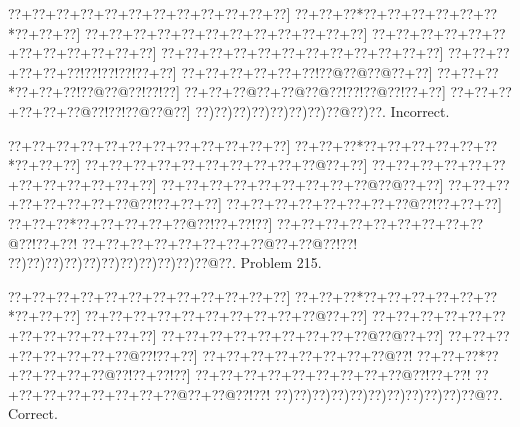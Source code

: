 \documentclass[a5paper]{article}
\begin{document}
\begin{center}
{\goo
\0??+\0??+\0??+\0??+\0??+\0??+\0??+\0??+\0??+\0??+\0??+\0??]
\0??+\0??+\0??*\0??+\0??+\0??+\0??+\0??+\0??*\0??+\0??+\0??]
\0??+\0??+\0??+\0??+\0??+\0??+\0??+\0??+\0??+\0??+\0??+\0??]
\0??+\0??+\0??+\0??+\0??+\0??+\0??+\0??+\0??+\0??+\0??+\0??]
\0??+\0??+\0??+\0??+\0??+\0??+\0??+\0??+\0??+\0??+\0??+\0??]
\0??+\0??+\0??+\0??+\0??+\0??!\0??!\0??!\0??!\0??+\0??]
\0??+\0??+\0??+\0??+\0??+\0??!\0??@\0??@\0??@\0??+\0??]
\0??+\0??+\0??*\0??+\0??+\0??!\0??@\0??@\0??!\0??!\0??]
\0??+\0??+\0??@\0??+\0??@\0??@\0??!\0??!\0??@\0??!\0??+\0??]
\0??+\0??+\0??+\0??+\0??+\0??@\0??!\0??!\0??@\0??@\0??]
\0??)\0??)\0??)\0??)\0??)\0??)\0??)\0??@\0??)\0??.
}
Incorrect. 

\end{center}
\newpage
\begin{center}
{\goo
\0??+\0??+\0??+\0??+\0??+\0??+\0??+\0??+\0??+\0??+\0??+\0??]
\0??+\0??+\0??*\0??+\0??+\0??+\0??+\0??+\0??*\0??+\0??+\0??]
\0??+\0??+\0??+\0??+\0??+\0??+\0??+\0??+\0??+\0??@\0??+\0??]
\0??+\0??+\0??+\0??+\0??+\0??+\0??+\0??+\0??+\0??+\0??+\0??]
\0??+\0??+\0??+\0??+\0??+\0??+\0??+\0??+\0??@\0??@\0??+\0??]
\0??+\0??+\0??+\0??+\0??+\0??+\0??+\0??@\0??!\0??+\0??+\0??]
\0??+\0??+\0??+\0??+\0??+\0??+\0??+\0??@\0??!\0??+\0??+\0??]
\0??+\0??+\0??*\0??+\0??+\0??+\0??+\0??@\0??!\0??+\0??!\0??]
\0??+\0??+\0??+\0??+\0??+\0??+\0??+\0??+\0??@\0??!\0??+\0??!
\0??+\0??+\0??+\0??+\0??+\0??+\0??+\0??@\0??+\0??@\0??!\0??!
\0??)\0??)\0??)\0??)\0??)\0??)\0??)\0??)\0??)\0??)\0??@\0??.
}
Problem 215.

\end{center}
\begin{center}
{\goo
\0??+\0??+\0??+\0??+\0??+\0??+\0??+\0??+\0??+\0??+\0??+\0??]
\0??+\0??+\0??*\0??+\0??+\0??+\0??+\0??+\0??*\0??+\0??+\0??]
\0??+\0??+\0??+\0??+\0??+\0??+\0??+\0??+\0??+\0??@\0??+\0??]
\0??+\0??+\0??+\0??+\0??+\0??+\0??+\0??+\0??+\0??+\0??+\0??]
\0??+\0??+\0??+\0??+\0??+\0??+\0??+\0??+\0??@\0??@\0??+\0??]
\0??+\0??+\0??+\0??+\0??+\0??+\0??+\0??@\0??!\0??+\0??]
\0??+\0??+\0??+\0??+\0??+\0??+\0??+\0??@\0??!
\0??+\0??+\0??*\0??+\0??+\0??+\0??+\0??@\0??!\0??+\0??!\0??]
\0??+\0??+\0??+\0??+\0??+\0??+\0??+\0??+\0??@\0??!\0??+\0??!
\0??+\0??+\0??+\0??+\0??+\0??+\0??+\0??@\0??+\0??@\0??!\0??!
\0??)\0??)\0??)\0??)\0??)\0??)\0??)\0??)\0??)\0??)\0??@\0??.
}
Correct. 

\end{center}
\end{document}
